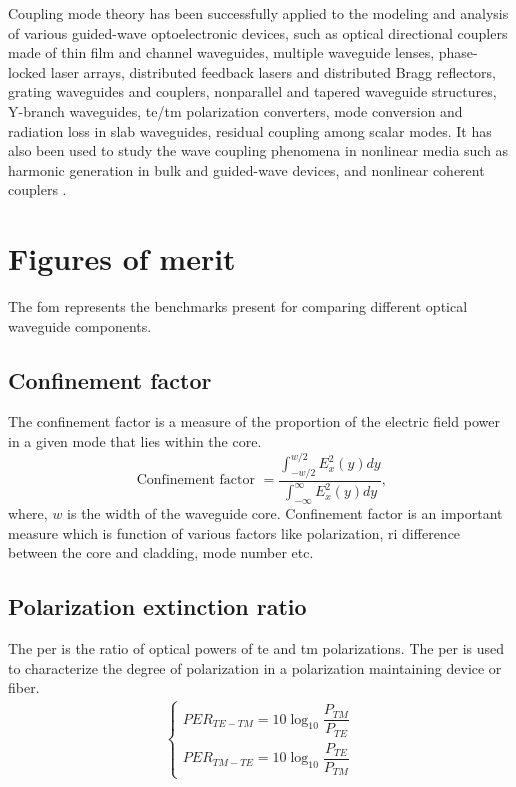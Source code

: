\documentclass[../report.tex]{subfiles}
\begin{document}
\par 
Coupling mode theory has been successfully applied to the modeling and analysis of various guided-wave optoelectronic devices, such as optical directional couplers made of thin film and channel waveguides, multiple waveguide lenses, phase-locked laser arrays, distributed feedback lasers and distributed Bragg reflectors, grating waveguides and couplers, nonparallel and tapered waveguide structures, Y-branch waveguides, \gls{te}/\gls{tm} polarization converters, mode conversion and radiation loss in slab waveguides, residual coupling among scalar modes. It has also been used to study the wave coupling phenomena in nonlinear media such as harmonic generation in bulk and guided-wave devices, and nonlinear coherent couplers \cite{haus_coupled_1991}.

\section{Figures of merit}
The \gls{fom} represents the benchmarks present for comparing different optical waveguide components.			
\subsection{Confinement factor}
The confinement factor is a measure of the proportion of the electric field power in a given mode that lies within the core.  
\begin{equation}\label{eq:per}
\text{ Confinement factor } = \dfrac {\int _{-w / 2}^{w/2}E_{x}^{2}\left( y\right) dy} {\int _{-\infty }^{\infty }E_{x}^{2}\left( y\right) dy},
\end{equation}
where, $w$ is the width of the waveguide core. Confinement factor is an important measure which is function of various factors like polarization, \gls{ri} difference between the core and cladding, mode number etc.	

\subsection{Polarization extinction ratio}
The \gls{per} is the ratio of optical powers of \gls{te} and \gls{tm} polarizations. The \gls{per} is used to characterize the degree of polarization in a polarization maintaining device or fiber. 	
\begin{equation}\label{eq:wave_sop}
\begin{aligned}
\begin{cases}
PER_{TE-TM} = 10\log_{10} \dfrac {P_{TM}} {P_{TE}}\\
PER_{TM-TE} = 10\log_{10} \dfrac {P_{TE}} {P_{TM}}
\end{cases}
\end{aligned}
\end{equation}
\end{document}
